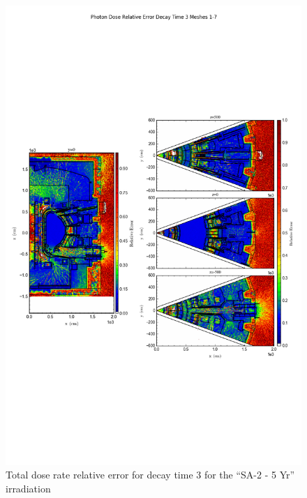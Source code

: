 \documentclass[12pt]{article}
\begin{document}
\begin{figure}[ht!]
\centering
\includegraphics[trim={0cm 8cm, 0cm 8cm},clip,scale=0.75]{../plots/final_model/10year/Photon_Dose_Relative_Error_Decay_Time_3_Meshes_1-7.png}
\caption{Total dose rate relative error for decay time 3 for the ``SA-2 - 5 Yr'' irradiation}
\label{fig:photons_10y_dc3_nob4c_relerr}
\end{figure}
\end{document}
